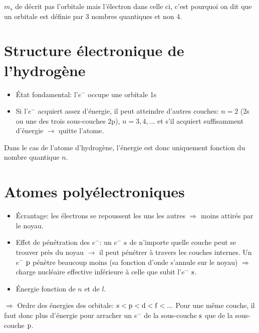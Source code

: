 $m_s$ de décrit pas l'orbitale mais l'électron dans celle ci,
c'est pourquoi on dit que un orbitale est définie par 3 nombres quantiques et non 4.


\section{Structure électronique de l'hydrogène}
\begin{itemize}
  \item \'Etat fondamental: l'$e^-$ occupe une orbitale 1s
  \item Si l'$e^-$ acquiert assez d'énergie,
    il peut atteindre d'autres couches:
    $n=2$ (2s ou une des trois sous-couches 2p),
    $n=3,4,\ldots$
    et s'il acquiert suffisamment d'énergie $\rightarrow$ quitte l'atome.
\end{itemize}

Dans le cas de l'atome d'hydrogène,
l'énergie est donc uniquement fonction du nombre quantique $n$.

\section{Atomes polyélectroniques}
\begin{itemize}
  \item \'Ecrantage: les électrons se repoussent les uns les autres $\Rightarrow$ moins attirés par le noyau.
  \item Effet de pénétration des $e^-$: un $e^-$ $\mathrm{s}$ de n'importe quelle couche peut se trouver près du noyau $\rightarrow$ il peut pénétrer à travers les couches internes.
    Un $e^-$ $\mathrm{p}$ pénètre beaucoup moins (sa fonction d'onde s'annule sur le noyau) $\Rightarrow$ charge nucléaire effective inférieure à celle que subit l'$e^-$ $\mathrm{s}$.
  \item \'Energie fonction de $n$ et de $l$.
\end{itemize}
$\Rightarrow$ Ordre des énergies des orbitale: $\mathrm{s}<\mathrm{p}<\mathrm{d}<\mathrm{f}<...$
Pour une même couche,
il faut donc plus d'énergie pour arracher un $e^-$ de la sous-couche $\mathrm{s}$ que de la sous-couche $\mathrm{p}$.

